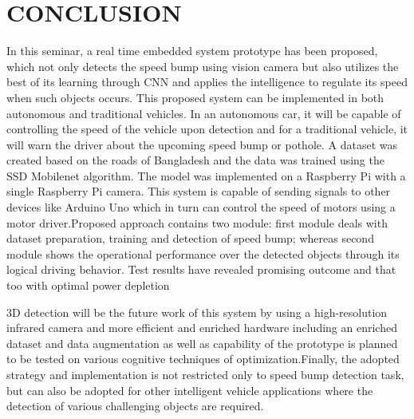 \graphicspath{{Figures/chapter2}}
\chapter{CONCLUSION}
In this seminar, a real time embedded
system prototype has been proposed, which not only detects
the speed bump using vision camera but also utilizes the
best of its learning through CNN and applies the intelligence
to regulate its speed when such objects occurs. This proposed system can be implemented in
both autonomous and traditional vehicles. In an autonomous
car, it will be capable of controlling the speed of the vehicle
upon detection and for a traditional vehicle, it will warn the
driver about the upcoming speed bump or pothole. A dataset
was created based on the roads of Bangladesh and the data
was trained using the SSD Mobilenet algorithm. The model
was implemented on a Raspberry Pi with a single Raspberry
Pi camera. This system is capable of sending signals to other
devices like Arduino Uno which in turn can control the speed
of motors using a motor driver.Proposed
approach contains two module: first module deals with dataset
preparation, training and detection of speed bump; whereas
second module shows the operational performance over the
detected objects through its logical driving behavior. Test
results have revealed promising outcome and that too with
optimal power depletion


\noindent
 3D detection will be the future work of this system by
using a high-resolution infrared camera and more efficient
and enriched hardware including an enriched dataset and data
augmentation as well as capability
of the prototype is planned to be tested on various cognitive
techniques of optimization.Finally, the adopted strategy and
implementation is not restricted only to speed bump detection
task, but can also be adopted for other intelligent vehicle
applications where the detection of various challenging objects
are required.